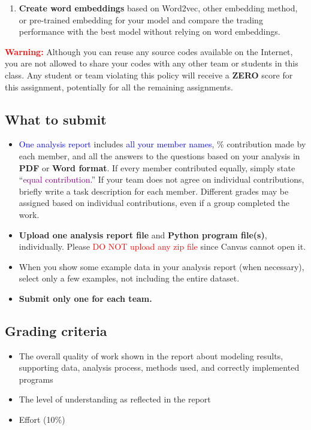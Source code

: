 \documentclass[twocolumn,10pt]{article}
\begin{document}
\begin{multicols}{2}
\begin{flushleft}
\begin{enumerate}
	\item \textbf{Create word embeddings} based on Word2vec, other embedding method, or pre-trained embedding for your model and compare the trading performance with the best model without relying on word embeddings.
\end{enumerate}

\textcolor{red}{\textbf{Warning:}} Although you can reuse any source codes available on the Internet, you are not allowed to share your codes with any other team or students in this class. Any student or team violating this policy will receive a \textbf{ZERO} score for this assignment, potentially for all the remaining assignments.

\subsection*{What to submit}
\begin{itemize}
	\item \textcolor{blue}{One analysis report} includes \textcolor{blue}{all your member names}, \% contribution made by each member, and all the answers to the questions based on your analysis in \textbf{PDF} or \textbf{Word format}. If every member contributed equally, simply state \enquote{\textcolor{purple}{equal contribution}.} If your team does not agree on individual contributions, briefly write a task description for each member. Different grades may be assigned based on individual contributions, even if a group completed the work.
	\item \textbf{Upload one analysis report file} and \textbf{Python program file(s)}, individually. Please \textcolor{red}{DO NOT upload any zip file} since Canvas cannot open it.
	\item When you show some example data in your analysis report (when necessary), select only a few examples, not including the entire dataset.
	\item \textbf{Submit only one for each team.}
\end{itemize}

\subsection*{Grading criteria}
\begin{itemize}
	\item The overall quality of work shown in the report about modeling results, supporting data, analysis process, methods used, and correctly implemented programs
	\item The level of understanding as reflected in the report
	\item Effort (10\%)
\end{itemize}


\end{flushleft}
\end{multicols}
\end{document}
